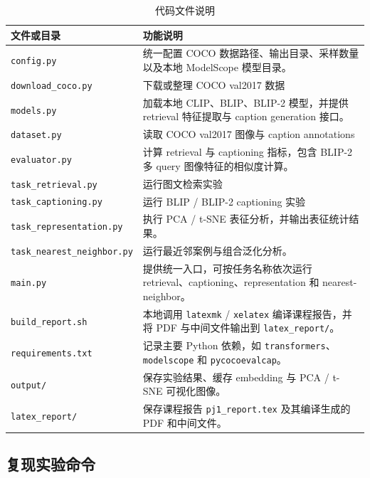 \documentclass[UTF8,a4paper,10pt]{ctexart}
\begin{document}
\begin{table}[H]
    \centering
    \caption{代码文件说明}
    \begin{tabular}{p{4.7cm}p{9.3cm}}
        \toprule
        文件或目录 & 功能说明 \\
        \midrule
        \texttt{config.py} & 统一配置 COCO 数据路径、输出目录、采样数量以及本地 ModelScope 模型目录。 \\
        \texttt{download\_coco.py} & 下载或整理 COCO val2017 数据 \\
        \texttt{models.py} & 加载本地 CLIP、BLIP、BLIP-2 模型，并提供 retrieval 特征提取与 caption generation 接口。 \\
        \texttt{dataset.py} & 读取 COCO val2017 图像与 caption annotations \\
        \texttt{evaluator.py} & 计算 retrieval 与 captioning 指标，包含 BLIP-2 多 query 图像特征的相似度计算。 \\
        \texttt{task\_retrieval.py} & 运行图文检索实验 \\
        \texttt{task\_captioning.py} & 运行 BLIP / BLIP-2 captioning 实验 \\
        \texttt{task\_representation.py} & 执行 PCA / t-SNE 表征分析，并输出表征统计结果。 \\
        \texttt{task\_nearest\_neighbor.py} & 运行最近邻案例与组合泛化分析。 \\
        \texttt{main.py} & 提供统一入口，可按任务名称依次运行 retrieval、captioning、representation 和 nearest-neighbor。 \\
        \texttt{build\_report.sh} & 本地调用 \texttt{latexmk} / \texttt{xelatex} 编译课程报告，并将 PDF 与中间文件输出到 \texttt{latex\_report/}。 \\
        \texttt{requirements.txt} & 记录主要 Python 依赖，如 \texttt{transformers}、\texttt{modelscope} 和 \texttt{pycocoevalcap}。 \\
        \texttt{output/} & 保存实验结果、缓存 embedding 与 PCA / t-SNE 可视化图像。 \\
        \texttt{latex\_report/} & 保存课程报告 \texttt{pj1\_report.tex} 及其编译生成的 PDF 和中间文件。 \\
        \bottomrule
    \end{tabular}
\end{table}

\subsection{复现实验命令}
\end{document}
